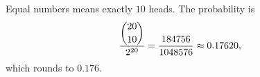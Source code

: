 Equal numbers means exactly $10$ heads. The probability is
\[
\dfrac{\dbinom{20}{10}}{2^{20}}=\dfrac{184756}{1048576}\approx0.17620,
\]
which rounds to $\boxed{0.176}$.
